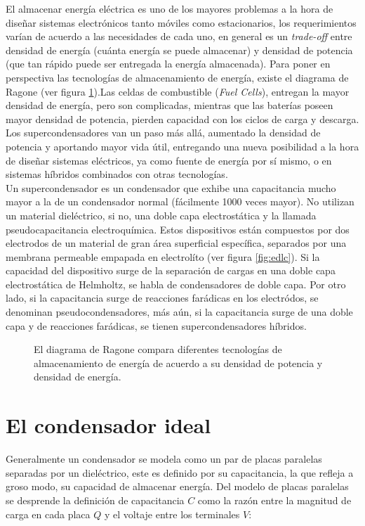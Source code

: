El almacenar energía eléctrica es uno de los mayores problemas a la hora de diseñar sistemas electrónicos tanto móviles como estacionarios, los requerimientos varían de acuerdo a las necesidades de cada uno, en general es un \textit{trade-off} entre densidad de energía (cuánta energía se puede almacenar) y densidad de potencia (que tan rápido puede ser entregada la energía almacenada). Para poner en perspectiva las tecnologías de almacenamiento de energía, existe el diagrama de Ragone (ver figura \ref{fig:ragone}).Las celdas de combustible (\textit{Fuel Cells}), entregan la mayor densidad de energía, pero son complicadas, mientras que las baterías poseen mayor densidad de potencia, pierden capacidad con los ciclos de carga y descarga. Los supercondensadores van un paso más allá, aumentado la densidad de potencia y aportando mayor vida útil, entregando una nueva posibilidad a la hora de diseñar sistemas eléctricos, ya como fuente de energía por sí mismo, o en sistemas híbridos combinados con otras tecnologías\citep{Thounthong2009}.\\
Un supercondensador es un condensador que exhibe una capacitancia mucho mayor a la de un condensador normal (fácilmente 1000 veces mayor). No utilizan un material dieléctrico, si no, una doble capa electrostática y la llamada pseudocapacitancia electroquímica. Estos dispositivos están compuestos por dos electrodos de un material de gran área superficial específica, separados por una membrana permeable empapada en electrolíto (ver figura \ref{fig:edlc}). Si la capacidad del dispositivo surge de la separación de cargas en una doble capa electrostática de Helmholtz, se habla de condensadores de doble capa. Por otro lado, si la capacitancia surge de reacciones farádicas en los electródos, se denominan pseudocondensadores, más aún, si la capacitancia surge de una doble capa y de reacciones farádicas, se tienen supercondensadores híbridos.

\begin{figure}
	\centering
	\caption[Diagrama de Ragone]{El diagrama de Ragone compara diferentes tecnologías de almacenamiento de energía de acuerdo a su densidad de potencia y densidad de energía.}
	\label{fig:ragone}
\end{figure}

\section{El condensador ideal}
Generalmente un condensador se modela como un par de placas paralelas separadas por un dieléctrico, este es definido por su capacitancia, la que refleja a groso modo, su capacidad de almacenar energía. Del modelo de placas paralelas se desprende la definición de capacitancia $C$ como la razón entre la magnitud de carga en cada placa $Q$ y el voltaje entre los terminales $V$:

